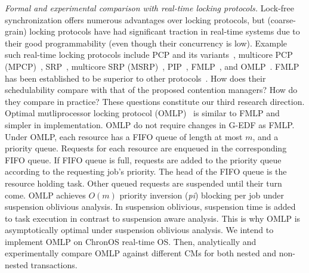 \documentclass[12pt,english]{report}
\begin{document}
\textit{Formal and experimental comparison with real-time locking protocols.} Lock-free synchronization offers numerous advantages over locking protocols, but (coarse-grain) locking protocols have had significant traction in real-time systems due to their good programmability (even though their concurrency is low).  Example such real-time locking protocols include PCP and its variants~\cite{chen1990dynamic,6031129,Rajkumar:1991:SRS:532621,sha1990priority}, multicore PCP (MPCP)~\cite{lakshmanan2009coordinated,rajkumar2002real}, SRP~\cite{Buttazzo:2004:HRC:1027504, baker1991stack}, multicore SRP (MSRP)~\cite{gai2003comparison}, PIP~\cite{easwaran2009resource}, FMLP~\cite{key-4,brandenburg2008implementation,holman2006locking}, and OMLP~\cite{Baruah:2007:TMG:1338441.1338647}. FMLP has been established to be superior to other protocols~\cite{brandenburg2008comparison}. How does their schedulability compare with that of the proposed contention managers? How do they compare in practice? These questions constitute our third research direction. 
Optimal mutliprocessor locking protocol (OMLP)~\cite{key-3} is similar to FMLP and simpler in implementation. OMLP do not require changes in G-EDF as FMLP. Under OMLP, each resource has a FIFO queue of length at most $m$, and a priority queue. Requests for each resource are enqueued in the corresponding FIFO queue. If FIFO queue is full, requests are added to the priority queue according to the requesting job's priority. The head of the FIFO queue is the resource holding task. Other queued requests are suspended until their turn come. OMLP achieves $O(m)$ priority inversion (\textit{pi}) blocking per job under suspension oblivious analysis. In suspension oblivious, suspension time is added to task execution in contrast to suspension aware analysis. This is why
OMLP is asymptotically optimal under suspension oblivious analysis. We intend to implement OMLP on ChronOS real-time OS. Then, analytically and experimentally compare OMLP against different CMs for both nested and non-nested transactions.




\end{document}
